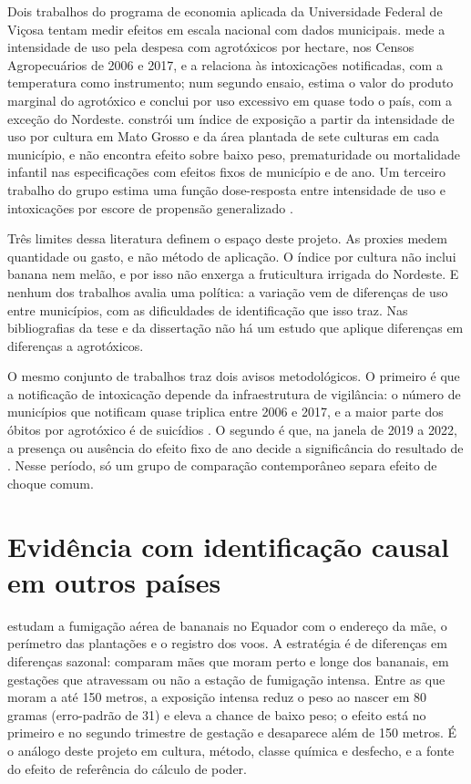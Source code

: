 Dois trabalhos do programa de economia aplicada da Universidade Federal de
Viçosa tentam medir efeitos em escala nacional com dados municipais.
 mede a intensidade de uso pela despesa com
agrotóxicos por hectare, nos Censos Agropecuários de 2006 e 2017, e a relaciona
às intoxicações notificadas, com a temperatura como instrumento; num segundo
ensaio, estima o valor do produto marginal do agrotóxico e conclui por uso
excessivo em quase todo o país, com a exceção do Nordeste. 
constrói um índice de exposição a partir da intensidade de uso por cultura em
Mato Grosso e da área plantada de sete culturas em cada município, e não
encontra efeito sobre baixo peso, prematuridade ou mortalidade infantil nas
especificações com efeitos fixos de município e de ano. Um terceiro trabalho do
grupo estima uma função dose-resposta entre intensidade de uso e intoxicações
por escore de propensão generalizado \cite{rodrigues2022intoxicacoes}.

Três limites dessa literatura definem o espaço deste projeto. As proxies medem
quantidade ou gasto, e não método de aplicação. O índice por cultura não inclui
banana nem melão, e por isso não enxerga a fruticultura irrigada do Nordeste. E
nenhum dos trabalhos avalia uma política: a variação vem de diferenças de uso
entre municípios, com as dificuldades de identificação que isso traz. Nas
bibliografias da tese e da dissertação não há um estudo que aplique diferenças
em diferenças a agrotóxicos.

O mesmo conjunto de trabalhos traz dois avisos metodológicos. O primeiro é que
a notificação de intoxicação depende da infraestrutura de vigilância: o número
de municípios que notificam quase triplica entre 2006 e 2017, e a maior parte
dos óbitos por agrotóxico é de suicídios \cite{rodrigues2022tese}. O segundo é
que, na janela de 2019 a 2022, a presença ou ausência do efeito fixo de ano
decide a significância do resultado de . Nesse período, só um
grupo de comparação contemporâneo separa efeito de choque comum.

\section{Evidência com identificação causal em outros países}

 estudam a fumigação aérea de bananais no Equador
com o endereço da mãe, o perímetro das plantações e o registro dos voos. A
estratégia é de diferenças em diferenças sazonal: comparam mães que moram perto
e longe dos bananais, em gestações que atravessam ou não a estação de fumigação
intensa. Entre as que moram a até 150 metros, a exposição intensa reduz o peso
ao nascer em 80 gramas (erro-padrão de 31) e eleva a chance de baixo peso; o
efeito está no primeiro e no segundo trimestre de gestação e desaparece além de
150 metros. É o análogo deste projeto em cultura, método, classe química e
desfecho, e a fonte do efeito de referência do cálculo de poder.

